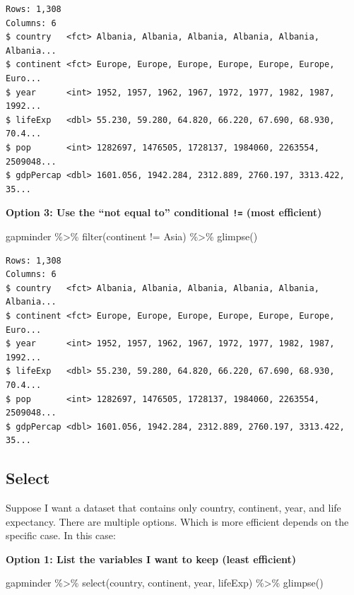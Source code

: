 \documentclass[
]{book}
\makeatletter
\newenvironment{Shaded}{\begin{snugshade}}{\end{snugshade}}
\newcommand{\FunctionTok}[1]{\textcolor[rgb]{0,0,0}{#1}}
\newcommand{\NormalTok}[1]{#1}
\newcommand{\SpecialCharTok}[1]{\textcolor[rgb]{0,0,0}{#1}}
\newcommand{\StringTok}[1]{\textcolor[rgb]{0.5,0.5,0.5}{#1}}
\newenvironment{kframe}{%
\medskip{}
\setlength{\fboxsep}{.8em}
 \def\at@end@of@kframe{}%
 \ifinner\ifhmode%
  \def\at@end@of@kframe{\end{minipage}}%
  \begin{minipage}{\columnwidth}%
 \fi\fi%
 \def\FrameCommand##1{\hskip\@totalleftmargin \hskip-\fboxsep
 \colorbox{shadecolor}{##1}\hskip-\fboxsep
     \hskip-\linewidth \hskip-\@totalleftmargin \hskip\columnwidth}%
 \MakeFramed {\advance\hsize-\width
   \@totalleftmargin\z@ \linewidth\hsize
   \@setminipage}}%
 {\par\unskip\endMakeFramed%
 \at@end@of@kframe}
\renewenvironment{Shaded}{\begin{kframe}}{\end{kframe}}
\makeatother
\begin{document}
\begin{verbatim}
Rows: 1,308
Columns: 6
$ country   <fct> Albania, Albania, Albania, Albania, Albania, Albania...
$ continent <fct> Europe, Europe, Europe, Europe, Europe, Europe, Euro...
$ year      <int> 1952, 1957, 1962, 1967, 1972, 1977, 1982, 1987, 1992...
$ lifeExp   <dbl> 55.230, 59.280, 64.820, 66.220, 67.690, 68.930, 70.4...
$ pop       <int> 1282697, 1476505, 1728137, 1984060, 2263554, 2509048...
$ gdpPercap <dbl> 1601.056, 1942.284, 2312.889, 2760.197, 3313.422, 35...
\end{verbatim}

\textbf{Option 3: Use the ``not equal to'' conditional \texttt{!=} (most efficient)}

\begin{Shaded}
\begin{Highlighting}[]
\NormalTok{gapminder }\SpecialCharTok{\%\textgreater{}\%} 
  \FunctionTok{filter}\NormalTok{(continent }\SpecialCharTok{!=} \StringTok{\textquotesingle{}Asia\textquotesingle{}}\NormalTok{) }\SpecialCharTok{\%\textgreater{}\%} 
  \FunctionTok{glimpse}\NormalTok{()}
\end{Highlighting}
\end{Shaded}

\begin{verbatim}
Rows: 1,308
Columns: 6
$ country   <fct> Albania, Albania, Albania, Albania, Albania, Albania...
$ continent <fct> Europe, Europe, Europe, Europe, Europe, Europe, Euro...
$ year      <int> 1952, 1957, 1962, 1967, 1972, 1977, 1982, 1987, 1992...
$ lifeExp   <dbl> 55.230, 59.280, 64.820, 66.220, 67.690, 68.930, 70.4...
$ pop       <int> 1282697, 1476505, 1728137, 1984060, 2263554, 2509048...
$ gdpPercap <dbl> 1601.056, 1942.284, 2312.889, 2760.197, 3313.422, 35...
\end{verbatim}

\hypertarget{select}{%
\subsection{Select}\label{select}}

Suppose I want a dataset that contains only country, continent, year, and life expectancy. There are multiple options. Which is more efficient depends on the specific case. In this case:

\textbf{Option 1: List the variables I want to keep (least efficient)}

\begin{Shaded}
\begin{Highlighting}[]
\NormalTok{gapminder }\SpecialCharTok{\%\textgreater{}\%} 
  \FunctionTok{select}\NormalTok{(country, continent, year, lifeExp) }\SpecialCharTok{\%\textgreater{}\%} 
  \FunctionTok{glimpse}\NormalTok{()}
\end{Highlighting}
\end{Shaded}
\end{document}
